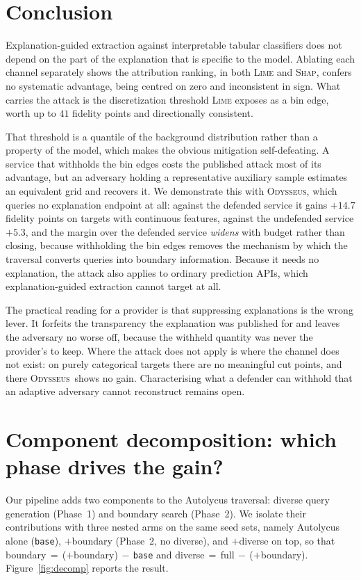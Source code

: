 \documentclass[sigconf,anonymous,review]{acmart}
\newcommand{\sys}{\textsc{Odysseus}}
\begin{document}
\section{Conclusion}
Explanation-guided extraction against interpretable tabular classifiers does not depend on the part of
the explanation that is specific to the model. Ablating each channel separately shows the attribution
ranking, in both \textsc{Lime} and \textsc{Shap}, confers no systematic advantage, being centred on
zero and inconsistent in sign. What carries the attack is the discretization threshold \textsc{Lime}
exposes as a bin edge, worth up to $41$ fidelity points and directionally consistent.

That threshold is a quantile of the background distribution rather than a property of the model, which
makes the obvious mitigation self-defeating. A service that withholds the bin edges costs the
published attack most of its advantage, but an adversary holding a representative auxiliary sample
estimates an equivalent grid and recovers it. We demonstrate this with \sys, which queries no
explanation endpoint at all: against the defended service it gains $+14.7$ fidelity points on targets
with continuous features, against the undefended service $+5.3$, and the margin over the defended
service \emph{widens} with budget rather than closing, because withholding the bin edges removes the
mechanism by which the traversal converts queries into boundary information. Because it needs no
explanation, the attack also applies to ordinary prediction APIs, which explanation-guided extraction
cannot target at all.

The practical reading for a provider is that suppressing explanations is the wrong lever. It forfeits
the transparency the explanation was published for and leaves the adversary no worse off, because the
withheld quantity was never the provider's to keep. Where the attack does not apply is where the
channel does not exist: on purely categorical targets there are no meaningful cut points, and there
\sys\ shows no gain. Characterising what a defender can withhold that an adaptive adversary cannot
reconstruct remains open.

\appendix

\section{Component decomposition: which phase drives the gain?}
\label{app:decomp}
\label{subsec:e1}
Our pipeline adds two components to the Autolycus traversal: diverse query generation (Phase~1) and
boundary search (Phase~2). We isolate their contributions with three nested arms on the same seed sets, namely Autolycus alone (\texttt{base}), $+$boundary (Phase~2, no diverse), and $+$diverse on top, so that boundary$\,=\,$($+$boundary)$\,-\,$\texttt{base} and
diverse$\,=\,$full$\,-\,$($+$boundary). Figure~\ref{fig:decomp} reports the result.
\end{document}
